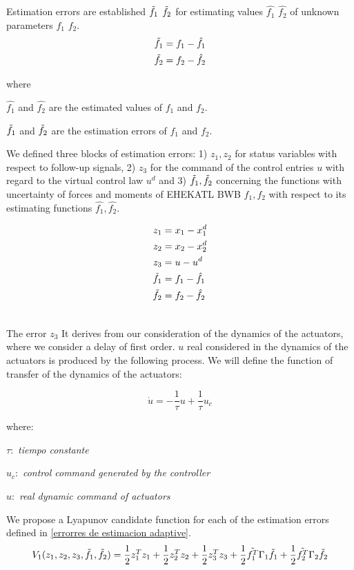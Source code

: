 Estimation errors are established $\Tilde{f_1}$ $\Tilde{f_2}$ for estimating values $\hat{f_1}$ $\hat{f_2}$ of unknown parameters $f_1$ $f_2$. 
\begin{gather}
    \Tilde{f_1} =f_1 - \hat{f_1}\\ \nonumber
    \Tilde{f_2} = f_2 - \hat{f_2} \nonumber
\end{gather}

where

$\hat{f_1}$ and $\hat{f_2}$ are the estimated values of $f_1$ and $f_2$.

$\Tilde{f_1}$ and $\Tilde{f_2}$ are the estimation errors of $f_1$ and $f_2$.


We defined three blocks of estimation errors: 1) $z_1, z_2$ for status variables with respect to follow-up signals, 2) $z_3$ for the command of the control entries $u$ with regard to the virtual control law $u^d$ and 3) $\Tilde{f_1}, \Tilde{f_2}$ concerning the functions with uncertainty of forces and moments of EHEKATL BWB $f_1, f_2$ with respect to its estimating functions $\hat{f_1}, \hat{f_2}$. 

\begin{align}
\label{errorres de estimacion adaptive}
    z_1 &= x_1 - x^d_1 \\ \nonumber
    z_2 &= x_2 - x^d_2 \\ \nonumber
    z_3 &= u - u^d \\ \nonumber
    \Tilde{f_1} &= f_1 - \hat{f_1} \\ \nonumber
    \Tilde{f_2} &= f_2 - \hat{f_2} \\ \nonumber
\end{align}

The error $z_3$ It derives from our consideration of the dynamics of the actuators, where we consider a delay of first order. $u$ real considered in the dynamics of the actuators is produced by the following process. We will define the function of transfer of the dynamics of the actuators: 

\begin{equation}
    \dot u = - \frac{1}{\tau}u + \frac{1}{\tau} u_c
\end{equation}

where:

$\tau:$ \textit{tiempo constante}


$u_{c}:$ \textit{control command generated by the controller} 


$u:$ \textit{real dynamic command of actuators}


We propose a Lyapunov candidate function for each of the estimation errors defined in \ref{errorres de estimacion adaptive}. 
\begin{equation}
    V_1 (z_1, z_2, z_3, \Tilde{f_1}, \Tilde{f_2}) = \frac{1}{2} z_1^T z_1 + \frac{1}{2} z_2^T z_2 + \frac{1}{2} z_3^T z_3 + \frac{1}{2} \Tilde{f_1^T} \Gamma_1 \Tilde{f_1} + \frac{1}{2} \Tilde{f_2^T} \Gamma_2 \Tilde{f_2}
\label{lyapunov 2}
\end{equation}

